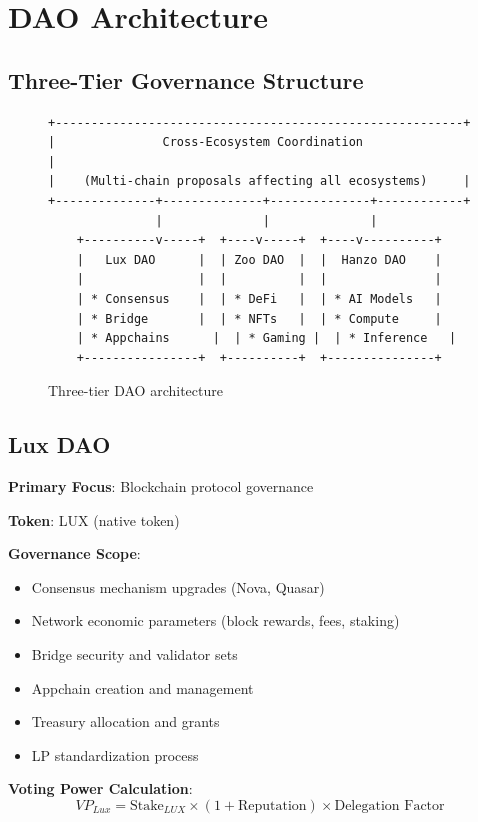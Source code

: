 \section{DAO Architecture}


\subsection{Three-Tier Governance Structure}

\begin{figure}[h]
\centering
\begin{verbatim}
+---------------------------------------------------------+
|               Cross-Ecosystem Coordination               |
|    (Multi-chain proposals affecting all ecosystems)     |
+--------------+--------------+--------------+------------+
               |              |              |
    +----------v-----+  +----v-----+  +----v----------+
    |   Lux DAO      |  | Zoo DAO  |  |  Hanzo DAO    |
    |                |  |          |  |               |
    | * Consensus    |  | * DeFi   |  | * AI Models   |
    | * Bridge       |  | * NFTs   |  | * Compute     |
    | * Appchains      |  | * Gaming |  | * Inference   |
    +----------------+  +----------+  +---------------+
\end{verbatim}
\caption{Three-tier DAO architecture}
\end{figure}

\subsection{Lux DAO}

\textbf{Primary Focus}: Blockchain protocol governance

\textbf{Token}: LUX (native token)

\textbf{Governance Scope}:
\begin{itemize}
\item Consensus mechanism upgrades (Nova, Quasar)
\item Network economic parameters (block rewards, fees, staking)
\item Bridge security and validator sets
\item Appchain creation and management
\item Treasury allocation and grants
\item LP standardization process
\end{itemize}

\textbf{Voting Power Calculation}:
\begin{equation}
VP_{Lux} = \text{Stake}_{LUX} \times (1 + \text{Reputation}) \times \text{Delegation Factor}
\end{equation}

